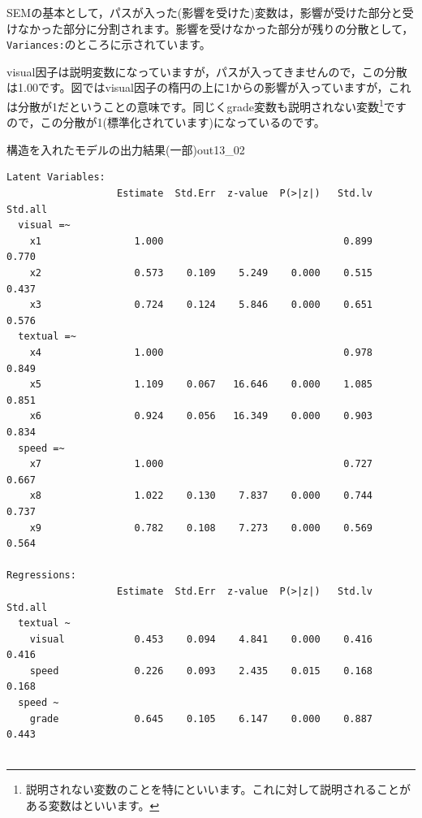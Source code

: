 \documentclass{ltjsbook}
\begin{document}
SEMの基本として，パスが入った(影響を受けた)変数は，影響が受けた部分と受けなかった部分に分割されます。影響を受けなかった部分が残りの分散として，\texttt{Variances:}のところに示されています。

visual因子は説明変数になっていますが，パスが入ってきませんので，この分散は1.00です。図ではvisual因子の楕円の上に1からの影響が入っていますが，これは分散が1だということの意味です。同じくgrade変数も説明されない変数\footnote{説明されない変数のことを特にといいます。これに対して説明されることがある変数はといいます。}ですので，この分散が1(標準化されています)になっているのです。

\begin{Rscreen}{構造を入れたモデルの出力結果(一部)}{out13_02}
    \begin{verbatim}
Latent Variables:
                   Estimate  Std.Err  z-value  P(>|z|)   Std.lv  Std.all
  visual =~                                                             
    x1                1.000                               0.899    0.770
    x2                0.573    0.109    5.249    0.000    0.515    0.437
    x3                0.724    0.124    5.846    0.000    0.651    0.576
  textual =~                                                            
    x4                1.000                               0.978    0.849
    x5                1.109    0.067   16.646    0.000    1.085    0.851
    x6                0.924    0.056   16.349    0.000    0.903    0.834
  speed =~                                                              
    x7                1.000                               0.727    0.667
    x8                1.022    0.130    7.837    0.000    0.744    0.737
    x9                0.782    0.108    7.273    0.000    0.569    0.564

Regressions:
                   Estimate  Std.Err  z-value  P(>|z|)   Std.lv  Std.all
  textual ~                                                             
    visual            0.453    0.094    4.841    0.000    0.416    0.416
    speed             0.226    0.093    2.435    0.015    0.168    0.168
  speed ~                                                               
    grade             0.645    0.105    6.147    0.000    0.887    0.443


\end{verbatim}
\end{Rscreen}
\end{document}
